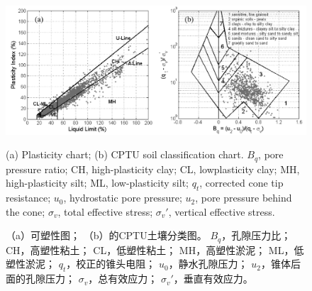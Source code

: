 \begin{figure}[!htb]
    \centering
    \includegraphics[width=\textwidth]{figures/figure-1.png}
    \caption{(a) Plasticity chart; (b) \citet{Robertson1990151} CPTU soil classification chart. $B_q$, pore pressure ratio; CH, high-plasticity clay; CL, lowplasticity clay; MH, high-plasticity silt; ML, low-plasticity silt; $q_t$, corrected cone tip resistance; $u_0$, hydrostatic pore pressure; $u_2$, pore pressure behind the cone; $\sigma_v$, total effective stress; $\sigma_v'$, vertical effective stress.}
    \addtocounter{figure}{-1}
    \vspace{-5pt}
    \renewcommand{\figurename}{图}
    \caption{（a）可塑性图； （b）\citet{Robertson1990151}的CPTU土壤分类图。 $B_q$，孔隙压力比； CH，高塑性粘土； CL，低塑性粘土； MH，高塑性淤泥； ML，低塑性淤泥； $q_t$，校正的锥头电阻； $u_0$，静水孔隙压力； $u_2$，锥体后面的孔隙压力； $\sigma_v$，总有效应力； $\sigma_v'$，垂直有效应力。}
    \renewcommand{\figurename}{Figure}
    \label{figure:1}
\end{figure}